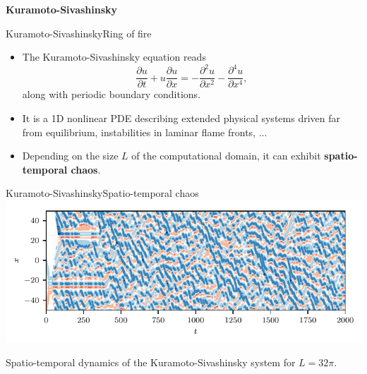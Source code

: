 \documentclass[usenames,dvipsnames,svgnames,10pt,aspectratio=169]{beamer}
\begin{document}


\begin{frame}[t, c]{}
	\centering
	\vspace{1cm}

	{\Large \textbf{Kuramoto-Sivashinsky}}

	\bigskip

	{}

\end{frame}

\begin{frame}[t, c]{Kuramoto-Sivashinsky}{Ring of fire}
	\begin{itemize}
		\item The Kuramoto-Sivashinsky equation reads
		$$\displaystyle \frac{\partial u}{\partial t} + u \frac{\partial u}{\partial x} = - \frac{\partial^2 u}{\partial x^2} - \frac{\partial^4 u}{\partial x^4},$$
		along with periodic boundary conditions.

		\bigskip

		\item It is a 1D nonlinear PDE describing extended physical systems driven far from equilibrium, instabilities in laminar flame fronts, ...

		\bigskip

		\item Depending on the size $L$ of the computational domain, it can exhibit \alert{\textbf{spatio-temporal chaos}}.
	\end{itemize}

	\vspace{1cm}
\end{frame}

\begin{frame}[t, c]{Kuramoto-Sivashinsky}{Spatio-temporal chaos}
	\centering
	\includegraphics[width=.75\textwidth]{kuramoto_sivashinsky_spatio_temporal_chaos}

	Spatio-temporal dynamics of the Kuramoto-Sivashinsky system for $L = 32 \pi$.

	\vspace{1cm}
\end{frame}
\end{document}
